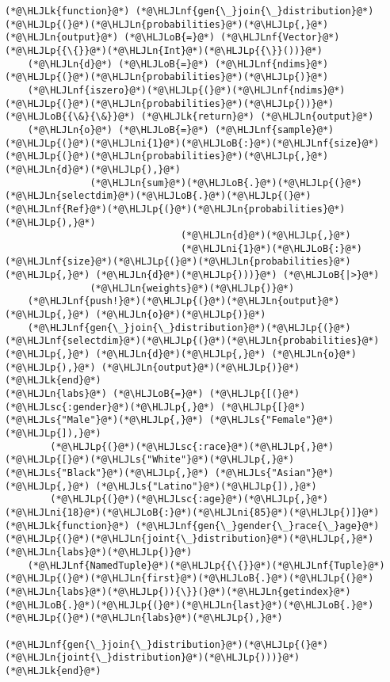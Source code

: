 \documentclass[12pt,a4paper]{article}
\newcommand{\HLJLk}[1]{\textcolor[RGB]{148,91,176}{\textbf{#1}}}
\newcommand{\HLJLn}[1]{#1}
\newcommand{\HLJLnf}[1]{\textcolor[RGB]{66,102,213}{#1}}
\newcommand{\HLJLs}[1]{\textcolor[RGB]{201,61,57}{#1}}
\newcommand{\HLJLsc}[1]{\textcolor[RGB]{201,61,57}{#1}}
\newcommand{\HLJLni}[1]{\textcolor[RGB]{59,151,46}{#1}}
\newcommand{\HLJLoB}[1]{\textcolor[RGB]{102,102,102}{\textbf{#1}}}
\newcommand{\HLJLp}[1]{#1}
\begin{document}
\begin{lstlisting}
(*@\HLJLk{function}@*) (*@\HLJLnf{gen{\_}join{\_}distribution}@*)(*@\HLJLp{(}@*)(*@\HLJLn{probabilities}@*)(*@\HLJLp{,}@*) (*@\HLJLn{output}@*) (*@\HLJLoB{=}@*) (*@\HLJLnf{Vector}@*)(*@\HLJLp{{\{}}@*)(*@\HLJLn{Int}@*)(*@\HLJLp{{\}}())}@*)
    (*@\HLJLn{d}@*) (*@\HLJLoB{=}@*) (*@\HLJLnf{ndims}@*)(*@\HLJLp{(}@*)(*@\HLJLn{probabilities}@*)(*@\HLJLp{)}@*)
    (*@\HLJLnf{iszero}@*)(*@\HLJLp{(}@*)(*@\HLJLnf{ndims}@*)(*@\HLJLp{(}@*)(*@\HLJLn{probabilities}@*)(*@\HLJLp{))}@*) (*@\HLJLoB{{\&}{\&}}@*) (*@\HLJLk{return}@*) (*@\HLJLn{output}@*)
    (*@\HLJLn{o}@*) (*@\HLJLoB{=}@*) (*@\HLJLnf{sample}@*)(*@\HLJLp{(}@*)(*@\HLJLni{1}@*)(*@\HLJLoB{:}@*)(*@\HLJLnf{size}@*)(*@\HLJLp{(}@*)(*@\HLJLn{probabilities}@*)(*@\HLJLp{,}@*) (*@\HLJLn{d}@*)(*@\HLJLp{),}@*)
               (*@\HLJLn{sum}@*)(*@\HLJLoB{.}@*)(*@\HLJLp{(}@*)(*@\HLJLn{selectdim}@*)(*@\HLJLoB{.}@*)(*@\HLJLp{(}@*)(*@\HLJLnf{Ref}@*)(*@\HLJLp{(}@*)(*@\HLJLn{probabilities}@*)(*@\HLJLp{),}@*)
                               (*@\HLJLn{d}@*)(*@\HLJLp{,}@*)
                               (*@\HLJLni{1}@*)(*@\HLJLoB{:}@*)(*@\HLJLnf{size}@*)(*@\HLJLp{(}@*)(*@\HLJLn{probabilities}@*)(*@\HLJLp{,}@*) (*@\HLJLn{d}@*)(*@\HLJLp{)))}@*) (*@\HLJLoB{|>}@*)
               (*@\HLJLn{weights}@*)(*@\HLJLp{)}@*)
    (*@\HLJLnf{push!}@*)(*@\HLJLp{(}@*)(*@\HLJLn{output}@*)(*@\HLJLp{,}@*) (*@\HLJLn{o}@*)(*@\HLJLp{)}@*)
    (*@\HLJLnf{gen{\_}join{\_}distribution}@*)(*@\HLJLp{(}@*)(*@\HLJLnf{selectdim}@*)(*@\HLJLp{(}@*)(*@\HLJLn{probabilities}@*)(*@\HLJLp{,}@*) (*@\HLJLn{d}@*)(*@\HLJLp{,}@*) (*@\HLJLn{o}@*)(*@\HLJLp{),}@*) (*@\HLJLn{output}@*)(*@\HLJLp{)}@*)
(*@\HLJLk{end}@*)
(*@\HLJLn{labs}@*) (*@\HLJLoB{=}@*) (*@\HLJLp{[(}@*)(*@\HLJLsc{:gender}@*)(*@\HLJLp{,}@*) (*@\HLJLp{[}@*)(*@\HLJLs{"Male"}@*)(*@\HLJLp{,}@*) (*@\HLJLs{"Female"}@*)(*@\HLJLp{]),}@*)
        (*@\HLJLp{(}@*)(*@\HLJLsc{:race}@*)(*@\HLJLp{,}@*) (*@\HLJLp{[}@*)(*@\HLJLs{"White"}@*)(*@\HLJLp{,}@*) (*@\HLJLs{"Black"}@*)(*@\HLJLp{,}@*) (*@\HLJLs{"Asian"}@*)(*@\HLJLp{,}@*) (*@\HLJLs{"Latino"}@*)(*@\HLJLp{]),}@*)
        (*@\HLJLp{(}@*)(*@\HLJLsc{:age}@*)(*@\HLJLp{,}@*) (*@\HLJLni{18}@*)(*@\HLJLoB{:}@*)(*@\HLJLni{85}@*)(*@\HLJLp{)]}@*)
(*@\HLJLk{function}@*) (*@\HLJLnf{gen{\_}gender{\_}race{\_}age}@*)(*@\HLJLp{(}@*)(*@\HLJLn{joint{\_}distribution}@*)(*@\HLJLp{,}@*) (*@\HLJLn{labs}@*)(*@\HLJLp{)}@*)
    (*@\HLJLnf{NamedTuple}@*)(*@\HLJLp{{\{}}@*)(*@\HLJLnf{Tuple}@*)(*@\HLJLp{(}@*)(*@\HLJLn{first}@*)(*@\HLJLoB{.}@*)(*@\HLJLp{(}@*)(*@\HLJLn{labs}@*)(*@\HLJLp{)){\}}(}@*)(*@\HLJLn{getindex}@*)(*@\HLJLoB{.}@*)(*@\HLJLp{(}@*)(*@\HLJLn{last}@*)(*@\HLJLoB{.}@*)(*@\HLJLp{(}@*)(*@\HLJLn{labs}@*)(*@\HLJLp{),}@*)
                                    (*@\HLJLnf{gen{\_}join{\_}distribution}@*)(*@\HLJLp{(}@*)(*@\HLJLn{joint{\_}distribution}@*)(*@\HLJLp{)))}@*)
(*@\HLJLk{end}@*)
\end{lstlisting}
\end{document}
